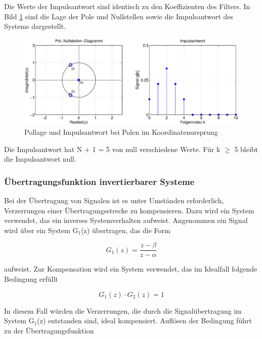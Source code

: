 \noindent Die Werte der Impulsantwort sind identisch zu den Koeffizienten des Filters. In Bild \ref{fig:SystemPoleImUrsprung} sind die Lage der Pole und Nullstellen sowie die Impulsantwort des Systems dargestellt.

\begin{figure}[H]
  \centerline{\includegraphics[width=1\textwidth]{Kapitel6/Bilder/image13.eps}}
  \caption{Pollage und Impulsantwort bei Polen im Koordinatenursprung}
  \label{fig:SystemPoleImUrsprung}
\end{figure}

\noindent Die Impulsantwort hat N + 1 = 5 von null verschiedene Werte. F\"{u}r k $\geq$ 5 bleibt die Impulsantwort null.

\subsubsection{\"{U}bertragungsfunktion invertierbarer Systeme}

\noindent Bei der \"{U}bertragung von Signalen ist es unter Umst\"{a}nden erforderlich, Verzerrungen einer \"{U}bertragungsstrecke zu kompensieren. Dazu wird ein System verwendet, das ein inverses Systemverhalten aufweist. Angenommen ein Signal wird \"{u}ber ein System G${}_{1}$(z) \"{u}bertragen, das die Form

\begin{equation}\label{eq:sixsonehundredeleven}
G_{1} \left(z\right)=\frac{z-\beta }{z-\alpha}
\end{equation}

\noindent aufweist. Zur Kompensation wird ein System verwendet, das im Idealfall folgende Bedingung erf\"{u}llt

\begin{equation}\label{eq:sixsonehundredtwelve}
G_{1} \left(z\right)\cdot G_{2} \left(z\right)=1
\end{equation}

\noindent In diesem Fall w\"{u}rden die Verzerrungen, die durch die Signal\"{u}bertragung im System G${}_{1}$(z) entstanden sind, ideal kompensiert. Aufl\"{o}sen der Bedingung f\"{u}hrt zu der \"{U}bertragungsfunktion

